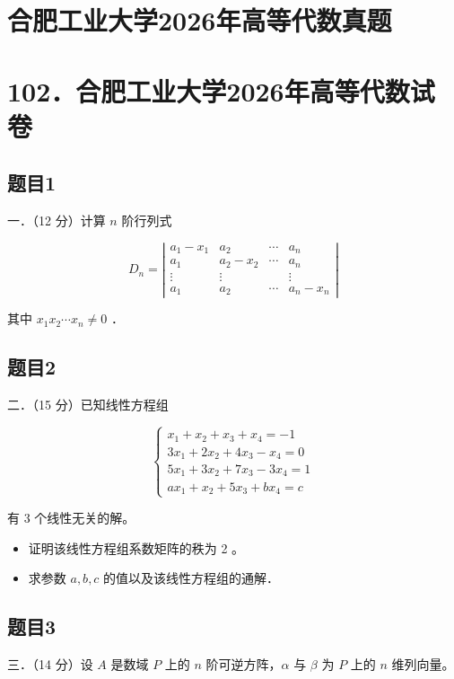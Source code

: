 \documentclass{article}
\begin{document}
\section*{合肥工业大学2026年高等代数真题}
\section*{102．合肥工业大学2026年高等代数试卷}

\subsection{题目1}
一．（12 分）计算 \(n\) 阶行列式

\[
D_{n}=\left|\begin{array}{cccc}
a_{1}-x_{1} & a_{2} & \cdots & a_{n} \\
a_{1} & a_{2}-x_{2} & \cdots & a_{n} \\
\vdots & \vdots & & \vdots \\
a_{1} & a_{2} & \cdots & a_{n}-x_{n}
\end{array}\right|
\]

其中 \(x_{1} x_{2} \cdots x_{n} \neq 0\) ．

\subsection{题目2}
二．（15 分）已知线性方程组

\[
\left\{\begin{array}{l}
x_{1}+x_{2}+x_{3}+x_{4}=-1 \\
3 x_{1}+2 x_{2}+4 x_{3}-x_{4}=0 \\
5 x_{1}+3 x_{2}+7 x_{3}-3 x_{4}=1 \\
a x_{1}+x_{2}+5 x_{3}+b x_{4}=c
\end{array}\right.
\]

有 3 个线性无关的解。

\begin{itemize}
  \item[（1）] 证明该线性方程组系数矩阵的秩为 2 。
  \item[（2）] 求参数 \(a, b, c\) 的值以及该线性方程组的通解．
\end{itemize}

\subsection{题目3}
三．（14 分）设 \(A\) 是数域 \(P\) 上的 \(n\) 阶可逆方阵，\(\alpha\) 与 \(\beta\) 为 \(P\) 上的 \(n\) 维列向量。
\end{document}
